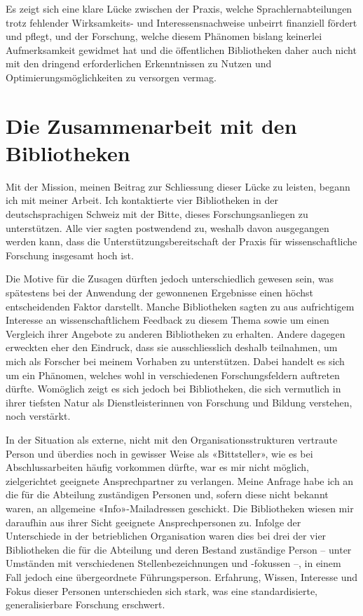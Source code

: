\documentclass[a4paper,
fontsize=11pt,
oneside,
numbers=noperiodatend,
parskip=half-,
bibliography=totoc,
final
]{scrartcl}
\begin{document}
Es zeigt sich eine klare Lücke zwischen der Praxis, welche
Sprachlernabteilungen trotz fehlender Wirksamkeits- und
Interessensnachweise unbeirrt finanziell fördert und pflegt, und der
Forschung, welche diesem Phänomen bislang keinerlei Aufmerksamkeit
gewidmet hat und die öffentlichen Bibliotheken daher auch nicht mit den
dringend erforderlichen Erkenntnissen zu Nutzen und
Optimierungsmöglichkeiten zu versorgen vermag.

\hypertarget{die-zusammenarbeit-mit-den-bibliotheken}{%
\section{Die Zusammenarbeit mit den
Bibliotheken}\label{die-zusammenarbeit-mit-den-bibliotheken}}

Mit der Mission, meinen Beitrag zur Schliessung dieser Lücke zu leisten,
begann ich mit meiner Arbeit. Ich kontaktierte vier Bibliotheken in der
deutschsprachigen Schweiz mit der Bitte, dieses Forschungsanliegen zu
unterstützen. Alle vier sagten postwendend zu, weshalb davon ausgegangen
werden kann, dass die Unterstützungsbereitschaft der Praxis für
wissenschaftliche Forschung insgesamt hoch ist.

Die Motive für die Zusagen dürften jedoch unterschiedlich gewesen sein,
was spätestens bei der Anwendung der gewonnenen Ergebnisse einen höchst
entscheidenden Faktor darstellt. Manche Bibliotheken sagten zu aus
aufrichtigem Interesse an wissenschaftlichem Feedback zu diesem Thema
sowie um einen Vergleich ihrer Angebote zu anderen Bibliotheken zu
erhalten. Andere dagegen erweckten eher den Eindruck, dass sie
ausschliesslich deshalb teilnahmen, um mich als Forscher bei meinem
Vorhaben zu unterstützen. Dabei handelt es sich um ein Phänomen, welches
wohl in verschiedenen Forschungsfeldern auftreten dürfte. Womöglich
zeigt es sich jedoch bei Bibliotheken, die sich vermutlich in ihrer
tiefsten Natur als Dienstleisterinnen von Forschung und Bildung
verstehen, noch verstärkt.

In der Situation als externe, nicht mit den Organisationsstrukturen
vertraute Person und überdies noch in gewisser Weise als «Bittsteller»,
wie es bei Abschlussarbeiten häufig vorkommen dürfte, war es mir nicht
möglich, zielgerichtet geeignete Ansprechpartner zu verlangen. Meine
Anfrage habe ich an die für die Abteilung zuständigen Personen und,
sofern diese nicht bekannt waren, an allgemeine «Info»-Mailadressen
geschickt. Die Bibliotheken wiesen mir daraufhin aus ihrer Sicht
geeignete Ansprechpersonen zu. Infolge der Unterschiede in der
betrieblichen Organisation waren dies bei drei der vier Bibliotheken die
für die Abteilung und deren Bestand zuständige Person -- unter Umständen
mit verschiedenen Stellenbezeichnungen und -fokussen --, in einem Fall
jedoch eine übergeordnete Führungsperson. Erfahrung, Wissen, Interesse
und Fokus dieser Personen unterschieden sich stark, was eine
standardisierte, generalisierbare Forschung erschwert.
\end{document}
